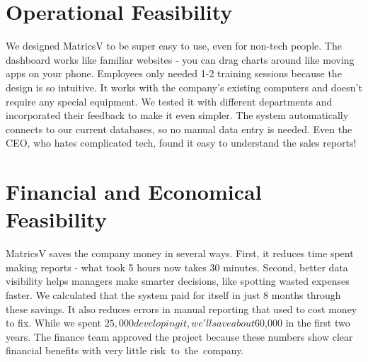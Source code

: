 \section{Operational Feasibility}
We designed MatricsV to be super easy to use, even for non-tech people. The dashboard works like familiar websites - you can drag charts around like moving apps on your phone. Employees only needed 1-2 training sessions because the design is so intuitive. It works with the company's existing computers and doesn't require any special equipment. We tested it with different departments and incorporated their feedback to make it even simpler. The system automatically connects to our current databases, so no manual data entry is needed. Even the CEO, who hates complicated tech, found it easy to understand the sales reports!

\section{Financial and Economical Feasibility}
MatricsV saves the company money in several ways. First, it reduces time spent making reports - what took 5 hours now takes 30 minutes. Second, better data visibility helps managers make smarter decisions, like spotting wasted expenses faster. We calculated that the system paid for itself in just 8 months through these savings. It also reduces errors in manual reporting that used to cost money to fix. While we spent $25,000 developing it, we'll save about $60,000 in the first two years. The finance team approved the project because these numbers show clear financial benefits with very little risk to the company.
